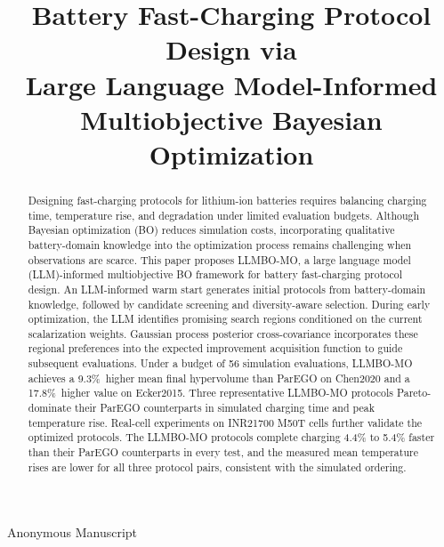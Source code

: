 \documentclass[journal,10pt]{IEEEtran}
\newcommand{\ChenFinalGain}{9.3\%}
\newcommand{\EckerFinalGain}{17.8\%}
\begin{document}
\title{Battery Fast-Charging Protocol Design via\\
Large Language Model-Informed Multiobjective Bayesian Optimization}

\author{}
%
{Anonymous Manuscript}

\maketitle

\begin{abstract}
Designing fast-charging protocols for lithium-ion batteries
requires balancing charging time, temperature rise, and
degradation under limited evaluation budgets. Although
Bayesian optimization (BO) reduces simulation costs,
incorporating qualitative battery-domain knowledge into
the optimization process remains challenging when
observations are scarce. This paper proposes LLMBO-MO,
a large language model (LLM)-informed multiobjective BO
framework for battery fast-charging protocol design.
An LLM-informed warm start generates initial protocols
from battery-domain knowledge, followed by candidate
screening and diversity-aware selection. During early
optimization, the LLM identifies promising search regions
conditioned on the current scalarization weights.
Gaussian process posterior cross-covariance incorporates
these regional preferences into the expected improvement
acquisition function to guide subsequent evaluations.
Under a budget of 56 simulation evaluations, LLMBO-MO
achieves a \ChenFinalGain\ higher mean final hypervolume
than ParEGO on Chen2020 and a \EckerFinalGain\ higher
value on Ecker2015. Three representative LLMBO-MO protocols
Pareto-dominate their ParEGO counterparts in simulated
charging time and peak temperature rise. Real-cell
experiments on INR21700 M50T cells further validate the
optimized protocols. The LLMBO-MO protocols complete
charging 4.4\% to 5.4\% faster than their ParEGO
counterparts in every test, and the measured mean
temperature rises are lower for all three protocol pairs,
consistent with the simulated ordering.
\end{abstract}
\end{document}
